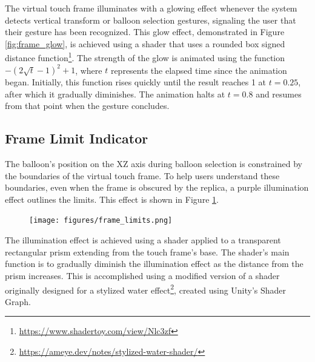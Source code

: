         The virtual touch frame illuminates with a glowing effect whenever the system detects vertical transform or balloon selection gestures, signaling the user that their gesture has been recognized. This glow effect, demonstrated in Figure \ref{fig:frame_glow}, is achieved using a shader that uses a rounded box signed distance function\footnote{\url{https://www.shadertoy.com/view/Nlc3zf}}. The strength of the glow is animated using the function \(-(2 \sqrt{t} - 1)^2 + 1\), where \(t\) represents the elapsed time since the animation began. Initially, this function rises quickly until the result reaches 1 at $t = 0.25$, after which it gradually diminishes. The animation halts at \(t = 0.8\) and resumes from that point when the gesture concludes.
                    


    
    
    \subsection{Frame Limit Indicator} \label{sec:frame_limits}

        The balloon's position on the XZ axis during balloon selection is constrained by the boundaries of the virtual touch frame. To help users understand these boundaries, even when the frame is obscured by the replica, a purple illumination effect outlines the limits. This effect is shown in Figure \ref{fig:frame_limits}.

        \begin{figure}[h!]
            \centering
            \texttt{[image: figures/frame\_limits.png]}
            \label{fig:frame_limits}
        \end{figure}
    
        The illumination effect is achieved using a shader applied to a transparent rectangular prism extending from the touch frame's base. The shader's main function is to gradually diminish the illumination effect as the distance from the prism increases. This is accomplished using a modified version of a shader originally designed for a stylized water effect\footnote{\url{https://ameye.dev/notes/stylized-water-shader/}}, created using Unity's Shader Graph.
        
